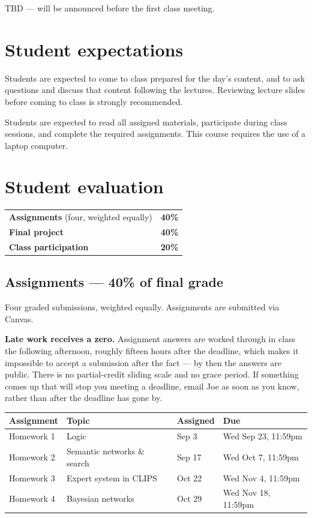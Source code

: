 \documentclass[11pt]{article}
\begin{document}
TBD --- will be announced before the first class meeting.

\section{Student expectations}

Students are expected to come to class prepared for the day's content, and to ask questions and
discuss that content following the lectures. Reviewing lecture slides before coming to class is
strongly recommended.

Students are expected to read all assigned materials, participate during class sessions, and
complete the required assignments. This course requires the use of a laptop computer.

\section{Student evaluation}

\begin{tabular}{@{}lr@{}}
  \toprule
  \textbf{Assignments} (four, weighted equally) & \textbf{40\%} \\
  \textbf{Final project} & \textbf{40\%} \\
  \textbf{Class participation} & \textbf{20\%} \\
  \bottomrule
\end{tabular}

\subsection{Assignments --- 40\% of final grade}

Four graded submissions, weighted equally. Assignments are submitted via Canvas.

\textbf{Late work receives a zero.} Assignment answers are worked through in class the following
afternoon, roughly fifteen hours after the deadline, which makes it impossible to accept a
submission after the fact --- by then the answers are public. There is no partial-credit sliding scale and no grace period. If something
comes up that will stop you meeting a deadline, email Joe as soon as you know, rather than after
the deadline has gone by.

\begin{tabular}{@{}llll@{}}
  \toprule
  \textbf{Assignment} & \textbf{Topic} & \textbf{Assigned} & \textbf{Due} \\
  \midrule
  Homework 1 & Logic & Sep 3 & Wed Sep 23, 11:59pm \\
  Homework 2 & Semantic networks \& search & Sep 17 & Wed Oct 7, 11:59pm \\
  Homework 3 & Expert system in CLIPS & Oct 22 & Wed Nov 4, 11:59pm \\
  Homework 4 & Bayesian networks & Oct 29 & Wed Nov 18, 11:59pm \\
  \bottomrule
\end{tabular}
\end{document}
